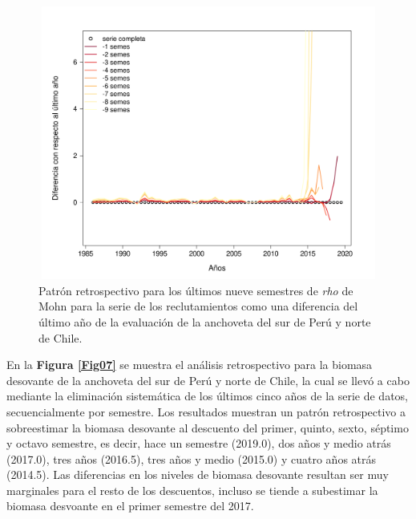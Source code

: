\documentclass[letter,11pt]{article}
\begin{document}
\vspace{0.5cm}
\begin{figure}[htb!]
 \centering
 \includegraphics[width=15cm,height=9cm]{fig/figura08.pdf}
 \caption{Patr\'on retrospectivo para los \'ultimos nueve semestres de \textit{rho} de Mohn
 para la serie de los reclutamientos como una diferencia del \'ultimo a\~{n}o de la evaluaci\'on
 de la anchoveta del sur de Per\'u y norte de Chile.}
 \label{Fig08}
\end{figure}
\vspace{0.5cm}



En la \textbf{Figura \ref{Fig07}} se muestra el an\'alisis retrospectivo para la biomasa desovante
de la anchoveta del sur de Per\'u y norte de Chile, la cual se llev\'o a cabo mediante la eliminaci\'on
sistem\'atica de los \'ultimos cinco a\~{n}os de la serie de datos, secuencialmente por semestre.
Los resultados muestran un patr\'on retrospectivo a sobreestimar la biomasa desovante al descuento del primer, quinto, sexto, s\'eptimo y octavo semestre, es decir, hace un semestre (2019.0), dos a\~{n}os
y medio atr\'as (2017.0), tres a\~{n}os (2016.5), tres a\~{n}os y medio (2015.0) y cuatro a\~{n}os
atr\'as (2014.5). Las diferencias en los niveles de biomasa desovante resultan ser muy marginales para el resto de los descuentos, incluso se tiende a subestimar la biomasa desvoante en el primer semestre
del 2017.\\
\end{document}
